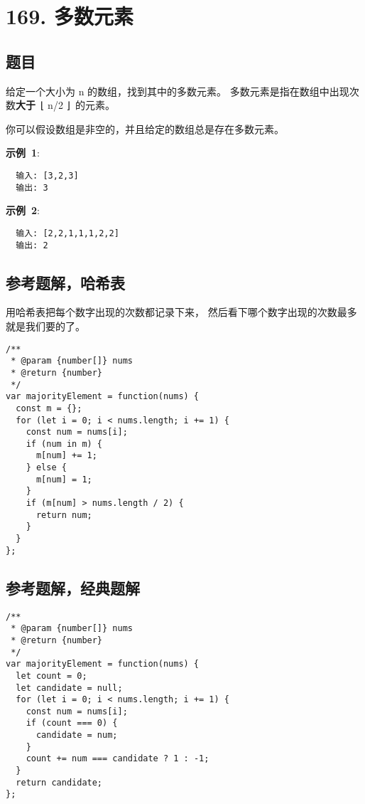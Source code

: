 \newpage
\section{169. 多数元素}
\label{leetcode:169}

\subsection{题目}

给定一个大小为 n 的数组，找到其中的多数元素。
多数元素是指在数组中出现次数\textbf{大于} ⌊ n/2 ⌋ 的元素。

你可以假设数组是非空的，并且给定的数组总是存在多数元素。

\textbf{示例 1}:

\begin{verbatim}
  输入: [3,2,3]
  输出: 3
\end{verbatim}

\textbf{示例 2}:

\begin{verbatim}
  输入: [2,2,1,1,1,2,2]
  输出: 2
\end{verbatim}

\subsection{参考题解，哈希表}

用哈希表把每个数字出现的次数都记录下来，
然后看下哪个数字出现的次数最多就是我们要的了。

\begin{verbatim}
/**
 * @param {number[]} nums
 * @return {number}
 */
var majorityElement = function(nums) {
  const m = {};
  for (let i = 0; i < nums.length; i += 1) {
    const num = nums[i];
    if (num in m) {
      m[num] += 1;
    } else {
      m[num] = 1;
    }
    if (m[num] > nums.length / 2) {
      return num;
    }
  }
};
\end{verbatim}

\subsection{参考题解，经典题解}

\begin{verbatim}
/**
 * @param {number[]} nums
 * @return {number}
 */
var majorityElement = function(nums) {
  let count = 0;
  let candidate = null;
  for (let i = 0; i < nums.length; i += 1) {
    const num = nums[i];
    if (count === 0) {
      candidate = num;
    }
    count += num === candidate ? 1 : -1;
  }
  return candidate;
};
\end{verbatim}
